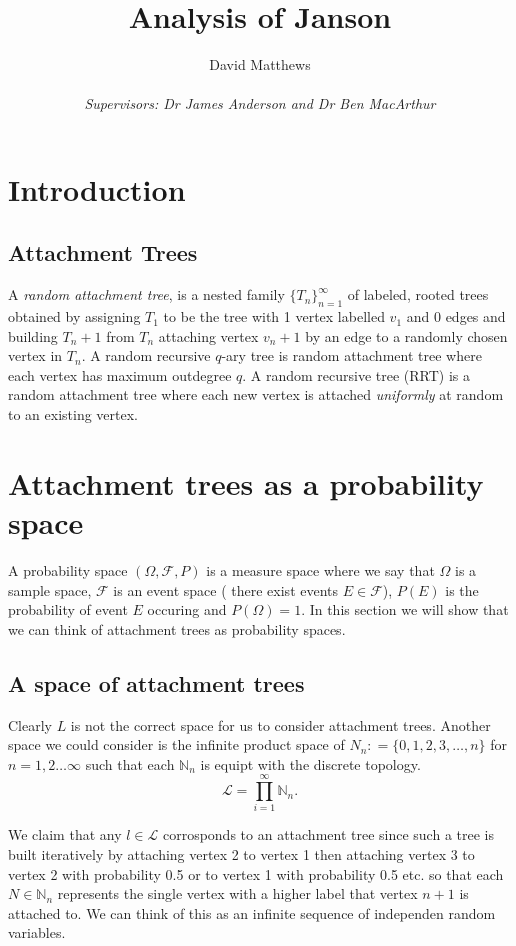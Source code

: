 \documentclass[8pt]{article} %
\title{Analysis of Janson}
\author{David Matthews \\\\\emph{Supervisors: Dr James Anderson and Dr Ben MacArthur}}
\theoremstyle{definition}
\begin{document}
\section{Introduction}


\subsection{Attachment Trees}
A \emph{random attachment tree}, is a nested family $\{T_n\}_{n=1}^{\infty}$ of  labeled, rooted trees obtained by assigning $T_1$ to be the tree with 1 vertex labelled $v_1$ and 0 edges and building $T_n+1$ from $T_n$ attaching vertex $v_n+1$ by an edge to a randomly chosen vertex in $T_n$. A random recursive $q$-ary tree is random attachment tree where each vertex has maximum outdegree $q$.  A random recursive tree (RRT) is a random attachment tree where each new vertex is attached \emph{uniformly} at random to an existing vertex.  

\section{Attachment trees as a probability space}
A probability space $(\Omega, \mathcal{F}, P)$  is a measure space where we say that $\Omega$ is a sample space, $\mathcal{F}$ is an event space ( there exist events $E \in \mathcal{F}$), $P(E)$ is the probability of event $E$ occuring and $P(\Omega) = 1$.  In this section we will show that we can think of attachment trees as probability spaces. 

 
\subsection{A space of attachment trees}\label{subsec:2}
Clearly $L$ is not the correct space for us to consider attachment trees.  Another space we could consider is the infinite product space of $N_{n}: = \{0,1,2,3,\dots, n\}$ for $n = 1,2 \dots \infty$ such that each $\mathbb{N}_n$ is equipt with the discrete topology.
\begin{equation}
 \mathcal{L} = \prod_{i = 1}^{\infty}\mathbb{N}_{n}.
\end{equation}

We claim that any $l \in \mathcal{L}$ corrosponds to an attachment tree since such a tree is built iteratively by attaching vertex 2 to vertex 1 then attaching vertex 3 to vertex 2 with probability 0.5 or to vertex 1 with probability 0.5 etc. so that each $N \in \mathbb{N}_n $ represents the single vertex with a higher label that vertex $n+1$ is attached to.  We can think of this as an infinite sequence of independen random variables.
\end{document}
